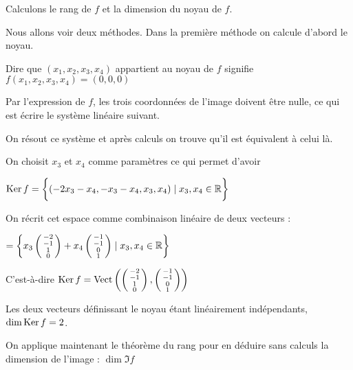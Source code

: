Calculons le rang de $f$ et la dimension du noyau de $f$.  

\change
Nous allons voir deux méthodes. Dans la première méthode
on calcule d'abord le noyau.

\change
  Dire que $ (x_1,x_2,x_3,x_4) $  appartient au noyau de $f$ signifie $f(x_1,x_2,x_3,x_4) = (0,0,0)$
  
  \change
  Par l'expression de $f$,
  les trois coordonnées de l'image doivent être nulle, ce qui est écrire
  le système linéaire suivant.
  
  \change
  On résout ce système et après calculs on trouve qu'il est équivalent 
  à celui là.
  
  \change
  On choisit $x_3$ et $x_4$ comme paramètres ce qui permet d'avoir
   
  $\mathop{\text{Ker}}\nolimits f = \bigg\{ (-2x_3-x_4,-x_3-x_4,x_3,x_4) \mid x_3,x_4 \in \mathbb{R}\bigg\}$
  
  \change
  On récrit cet espace comme combinaison linéaire de deux vecteurs :
  
  $  = \left\{ x_3 \left(\begin{smallmatrix}-2 \\-1 \\1 \\0 \end{smallmatrix}\right)
  + x_4 \left(\begin{smallmatrix}-1\\-1\\0\\1 \end{smallmatrix}\right)\mid x_3,x_4 \in \mathbb{R} \right\}$
  
  \change
  C'est-à-dire $\mathop{\text{Ker}}\nolimits f  = \mathop{\text{Vect}}\nolimits \left( \left(\begin{smallmatrix}-2 \\-1 \\1 \\0 \end{smallmatrix}\right),
  \left(\begin{smallmatrix}-1\\-1\\0\\1 \end{smallmatrix}\right)
  \right) $
  
  \change
  Les deux vecteurs définissant le noyau étant linéairement indépendants, 
  $\dim \mathop{\text{Ker}}\nolimits f = 2$. 
  
  \change
  On applique maintenant le théorème du rang pour en déduire sans calculs la dimension de l'image :
  $\dim \Im f$
  
